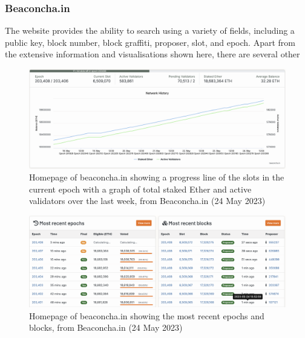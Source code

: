 \documentclass[UTF8]{article}
\begin{document}
\clearpage

\subsubsection*{Beaconcha.in}
The website provides the ability to search using a variety of fields, including a public key, block number, block graffiti, proposer, slot, and epoch. Apart from the extensive information and visualisations shown here, there are several other 

\begin{figure}[htbp]
\begin{center}
\includegraphics[width=0.9\linewidth]{images/bhomepg}
\caption{Homepage of beaconcha.in showing a progress line of the slots in the current epoch with a graph of total staked Ether and active validators over the last week, from Beaconcha.in (24 May 2023)}
\label{fig:bhomepg}
\end{center}
\end{figure}

\begin{figure}[htbp]
\begin{center}
\includegraphics[width=0.9\linewidth]{images/bhomepg2}
\caption{Homepage of beaconcha.in showing the most recent epochs and blocks, from Beaconcha.in (24 May 2023)}
\label{fig:bhomepg2}
\end{center}
\end{figure}
\clearpage
\end{document}
